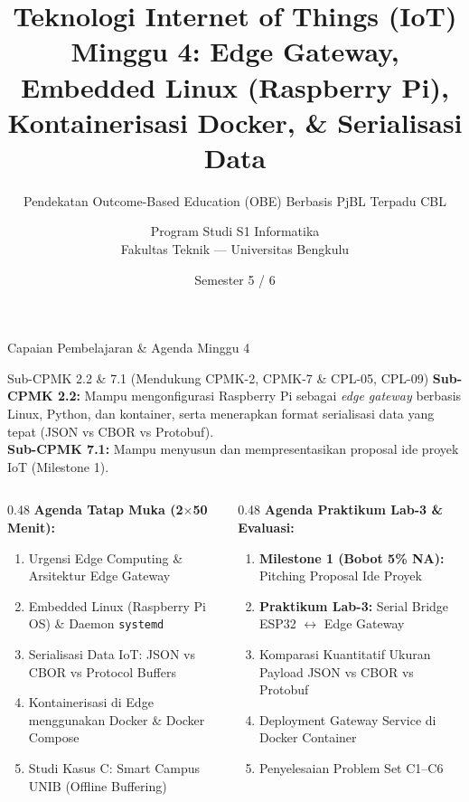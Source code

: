 \documentclass[aspectratio=169,10pt]{beamer}
\title[Teknologi IoT --- Minggu 4]{\texorpdfstring{\textbf{Teknologi Internet of Things (IoT)}\\Minggu 4: Edge Gateway, Embedded Linux (Raspberry Pi), Kontainerisasi Docker, \& Serialisasi Data}{Teknologi IoT - Minggu 4: Edge Gateway, Embedded Linux (Raspberry Pi), Kontainerisasi Docker, dan Serialisasi Data}}
\subtitle{Pendekatan Outcome-Based Education (OBE) Berbasis PjBL Terpadu CBL}
\author[Prodi S1 Informatika FT UNIB]{\texorpdfstring{Program Studi S1 Informatika\\Fakultas Teknik --- Universitas Bengkulu}{Prodi S1 Informatika FT UNIB}}
\date{Semester 5 / 6}
\begin{document}
\begin{frame}
    \titlepage
\end{frame}

\begin{frame}{Capaian Pembelajaran \& Agenda Minggu 4}
    \begin{block}{Sub-CPMK 2.2 \& 7.1 (Mendukung CPMK-2, CPMK-7 \& CPL-05, CPL-09)}
        \textbf{Sub-CPMK 2.2:} Mampu mengonfigurasi Raspberry Pi sebagai \textit{edge gateway} berbasis Linux, Python, dan kontainer, serta menerapkan format serialisasi data yang tepat (JSON vs CBOR vs Protobuf).\\
        \textbf{Sub-CPMK 7.1:} Mampu menyusun dan mempresentasikan proposal ide proyek IoT (Milestone 1).
    \end{block}
    \vspace{2pt}
    \begin{columns}[T]
        \begin{column}{0.48\textwidth}
            \textbf{Agenda Tatap Muka (2$\times$50 Menit):}
            \begin{enumerate}
                \item Urgensi Edge Computing \& Arsitektur Edge Gateway
                \item Embedded Linux (Raspberry Pi OS) \& Daemon \texttt{systemd}
                \item Serialisasi Data IoT: JSON vs CBOR vs Protocol Buffers
                \item Kontainerisasi di Edge menggunakan Docker \& Docker Compose
                \item Studi Kasus C: Smart Campus UNIB (Offline Buffering)
            \end{enumerate}
        \end{column}
        \begin{column}{0.48\textwidth}
            \textbf{Agenda Praktikum Lab-3 \& Evaluasi:}
            \begin{enumerate}
                \item \textbf{Milestone 1 (Bobot 5\% NA):} Pitching Proposal Ide Proyek
                \item \textbf{Praktikum Lab-3:} Serial Bridge ESP32 $\leftrightarrow$ Edge Gateway
                \item Komparasi Kuantitatif Ukuran Payload JSON vs CBOR vs Protobuf
                \item Deployment Gateway Service di Docker Container
                \item Penyelesaian Problem Set C1--C6
            \end{enumerate}
        \end{column}
    \end{columns}
\end{frame}
\end{document}
